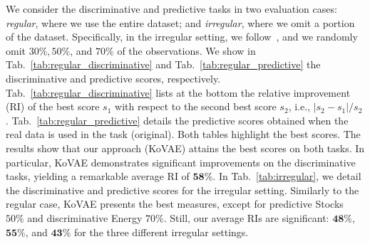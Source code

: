 \documentclass{article} %
\begin{document}
 
We consider the discriminative and predictive tasks in two evaluation cases: \emph{regular}, where we use the entire dataset; and \emph{irregular}, where we omit a portion of the dataset. Specifically, in the irregular setting, we follow~\cite{jeon2022gt}, and we randomly omit $30\%, 50\%$, and $70\%$ of the observations. We show in Tab.~\ref{tab:regular_discriminative} and Tab.~\ref{tab:regular_predictive} the discriminative and predictive scores, respectively. Tab.~\ref{tab:regular_discriminative} lists at the bottom the relative improvement (RI) of the best score $s_1$ with respect to the second best score $s_2$, i.e., $|s_2 - s_1| / s_2$. Tab.~\ref{tab:regular_predictive} details the predictive scores obtained when the real data is used in the task (original). Both tables highlight the best scores. The results show that our approach (KoVAE) attains the best scores on both tasks. In particular, KoVAE demonstrates significant improvements on the discriminative tasks, yielding a remarkable average RI of $\textbf{58\%}$. In Tab.~\ref{tab:irregular}, we detail the discriminative and predictive scores for the irregular setting. Similarly to the regular case, KoVAE presents the best measures, except for predictive Stocks $50\%$ and discriminative Energy $70\%$. Still, our average RIs are significant: $\textbf{48\%}$, $\textbf{55\%}$, and $\textbf{43\%}$ for the three different irregular settings.
\end{document}

